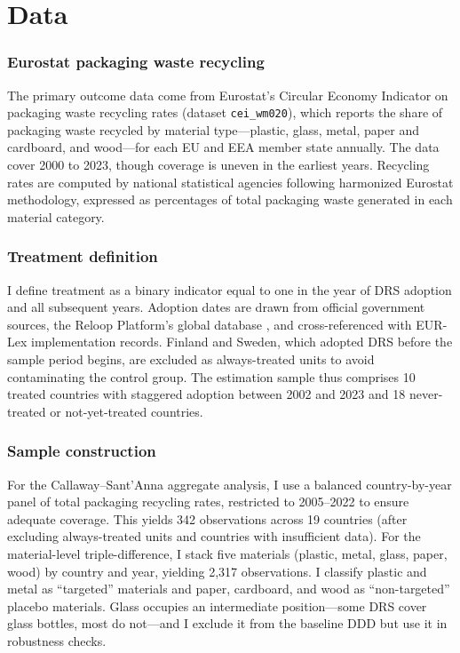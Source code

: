 \documentclass[12pt]{article}
\begin{document}
\section{Data}
\label{sec:data}

\subsubsection*{Eurostat packaging waste recycling} The primary outcome data come from Eurostat's Circular Economy Indicator on packaging waste recycling rates (dataset \texttt{cei\_wm020}), which reports the share of packaging waste recycled by material type---plastic, glass, metal, paper and cardboard, and wood---for each EU and EEA member state annually. The data cover 2000 to 2023, though coverage is uneven in the earliest years. Recycling rates are computed by national statistical agencies following harmonized Eurostat methodology, expressed as percentages of total packaging waste generated in each material category.

\subsubsection*{Treatment definition} I define treatment as a binary indicator equal to one in the year of DRS adoption and all subsequent years. Adoption dates are drawn from official government sources, the Reloop Platform's global database \citep{reloop2023drs}, and cross-referenced with EUR-Lex implementation records. Finland and Sweden, which adopted DRS before the sample period begins, are excluded as always-treated units to avoid contaminating the control group. The estimation sample thus comprises 10 treated countries with staggered adoption between 2002 and 2023 and 18 never-treated or not-yet-treated countries.

\subsubsection*{Sample construction} For the Callaway--Sant'Anna aggregate analysis, I use a balanced country-by-year panel of total packaging recycling rates, restricted to 2005--2022 to ensure adequate coverage. This yields 342 observations across 19 countries (after excluding always-treated units and countries with insufficient data). For the material-level triple-difference, I stack five materials (plastic, metal, glass, paper, wood) by country and year, yielding 2,317 observations. I classify plastic and metal as ``targeted'' materials and paper, cardboard, and wood as ``non-targeted'' placebo materials. Glass occupies an intermediate position---some DRS cover glass bottles, most do not---and I exclude it from the baseline DDD but use it in robustness checks.
\end{document}
